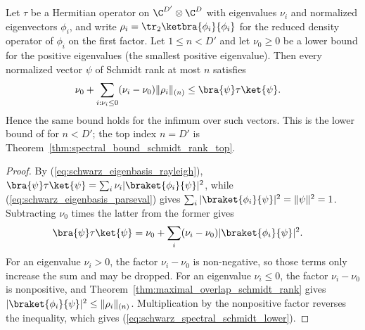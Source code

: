 \begin{theorem}
    \label{thm:spectral_lower_bound_schmidt_rank}
    \leanok
    Let $\tau$ be a Hermitian operator on $\C^{D'}\otimes\C^{D}$ with
    eigenvalues $\nu_i$ and normalized eigenvectors $\phi_i$, and write
    $\rho_i=\tr_2\ketbra{\phi_i}{\phi_i}$ for the reduced density operator of
    $\phi_i$ on the first factor. Let $1\le n<D'$ and let $\nu_0\ge 0$ be a
    lower bound for the positive eigenvalues (the smallest positive
    eigenvalue). Then every normalized vector $\psi$ of Schmidt rank at most
    $n$ satisfies
    \begin{align}
        \nu_0+\sum_{i:\nu_i\le0}
        (\nu_i-\nu_0)\|\rho_i\|_{(n)}
         & \le\bra{\psi}\tau\ket{\psi}.
        \label{eq:schwarz_spectral_schmidt_lower}
    \end{align}
    Hence the same bound holds for the infimum over such vectors. This is the
    lower bound of \cite[Chapter~3, Proposition~3.2]{Wolf2012Quantum} for
    $n<D'$; the top index $n=D'$ is
    Theorem~\ref{thm:spectral_bound_schmidt_rank_top}.
\end{theorem}

\begin{proof}
    \leanok
    By (\ref{eq:schwarz_eigenbasis_rayleigh}),
    $\bra{\psi}\tau\ket{\psi}
        =\sum_i\nu_i|\braket{\phi_i}{\psi}|^2$, while
    (\ref{eq:schwarz_eigenbasis_parseval}) gives
    $\sum_i|\braket{\phi_i}{\psi}|^2=\|\psi\|^2=1$. Subtracting $\nu_0$
    times the latter from the former gives
    \begin{align}
        \bra{\psi}\tau\ket{\psi}
         & =\nu_0+\sum_i(\nu_i-\nu_0)
        |\braket{\phi_i}{\psi}|^2.
        \label{eq:schwarz_spectral_lower_expansion}
    \end{align}
    For an eigenvalue $\nu_i>0$, the factor $\nu_i-\nu_0$ is non-negative, so
    those terms only increase the sum and may be dropped. For an eigenvalue
    $\nu_i\le0$, the factor $\nu_i-\nu_0$ is nonpositive, and
    Theorem~\ref{thm:maximal_overlap_schmidt_rank} gives
    $|\braket{\phi_i}{\psi}|^2\le\|\rho_i\|_{(n)}$. Multiplication by the
    nonpositive factor reverses the inequality, which gives
    (\ref{eq:schwarz_spectral_schmidt_lower}).
\end{proof}


